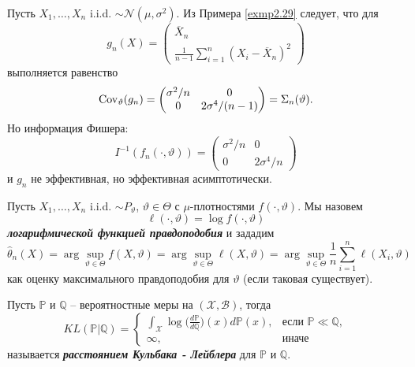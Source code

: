 \begin{exmp}
	Пусть $X_1, \dots, X_n$ i.i.d. $\sim \mathcal{N}(\mu, \sigma^2)$. Из Примера \ref{exmp2.29} следует, что для
	\[ g_n(X) = \begin{pmatrix}
	\overline{X}_n \\
	\frac{1}{n-1} \sum_{i=1}^{n} (X_i - \overline{X}_n)^2
	\end{pmatrix}  \]
	выполняется равенство
	\[ \operatorname{Cov}_\vartheta(g_n) = \begin{pmatrix}
	\sigma^2/n & 0 \\
	0 & 2\sigma^4 / (n - 1)
	\end{pmatrix}  
	= \Sigma_n(\vartheta). \]
	Но информация Фишера:
	\[ I^{-1}(f_n(\cdot, \vartheta)) = \begin{pmatrix}
	\sigma^2/n & 0 \\
	0 & 2\sigma^4 / n
	\end{pmatrix}   \]
	и $g_n$ не эффективная, но эффективная асимптотически.
\end{exmp}

\begin{rmrk}
	Пусть $X_1, \dots, X_n$ i.i.d. $\sim P_\vartheta$, $\vartheta \in \Theta$ с $\mu$-плотностями $f(\cdot, \vartheta)$. Мы назовем
	\[ \ell(\cdot, \vartheta) = \log f(\cdot, \vartheta)  \] 
	\textbf{\textit{логарифмической функцией правдоподобия}} и зададим
	\[ \hat{\theta}_n(X) = \arg \sup_{\vartheta \in \Theta} f(X, \vartheta) = \arg \sup_{\vartheta \in \Theta} \ell (X, \vartheta) = \arg \sup_{\vartheta \in \Theta} \frac{1}{n} \sum_{i=1}^{n} \ell (X_i, \vartheta) \]
	как оценку максимального правдоподобия для $\vartheta$ (если таковая существует).
\end{rmrk}

\begin{defn}
	Пусть $\mathbb{P}$ и $\mathbb{Q}$ -- вероятностные меры на $(\mathcal{X}, \mathcal{B})$, тогда
	\[ KL(\mathbb{P}|\mathbb{Q}) =
	\left \{
	\begin{array}{cl}
	\int_{\mathcal{X}} \log\Big(\frac{d\mathbb{P}}{d\mathbb{Q}}\Big)(x)  d\mathbb{P}(x), & \text{если } \mathbb{P} \ll \mathbb{Q}, \\
	\infty, & \text{иначе}  
	\end{array}
	\right.
	\]
	называется \textbf{\textit{расстоянием Кульбака - Лейблера}} для $\mathbb{P}$ и $\mathbb{Q}$.
\end{defn}

